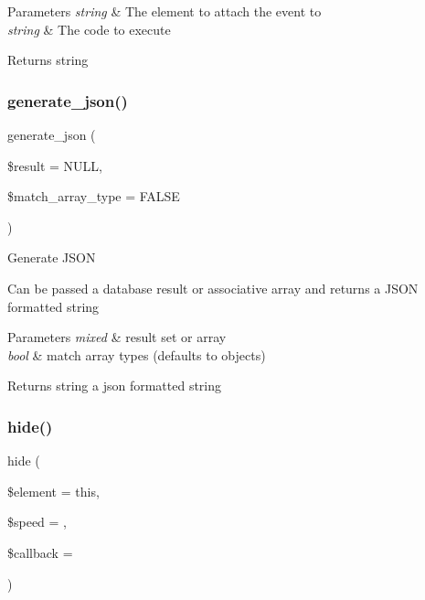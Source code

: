 \begin{DoxyParams}{Parameters}
{\em string} & The element to attach the event to \\
\hline
{\em string} & The code to execute \\
\hline
\end{DoxyParams}
\begin{DoxyReturn}{Returns}
string 
\end{DoxyReturn}
\mbox{\label{class_c_i___javascript_ae60bb50a1e4cbbce1f6c29a73fad5e07}} 
\subsubsection{\texorpdfstring{generate\+\_\+json()}{generate\_json()}}
{\footnotesize\ttfamily generate\+\_\+json (\begin{DoxyParamCaption}\item[{}]{\$result = {\ttfamily NULL},  }\item[{}]{\$match\+\_\+array\+\_\+type = {\ttfamily FALSE} }\end{DoxyParamCaption})}

Generate J\+S\+ON

Can be passed a database result or associative array and returns a J\+S\+ON formatted string


\begin{DoxyParams}{Parameters}
{\em mixed} & result set or array \\
\hline
{\em bool} & match array types (defaults to objects) \\
\hline
\end{DoxyParams}
\begin{DoxyReturn}{Returns}
string a json formatted string 
\end{DoxyReturn}
\mbox{\label{class_c_i___javascript_ace07091981f312c3be8238f08815142c}} 
\subsubsection{\texorpdfstring{hide()}{hide()}}
{\footnotesize\ttfamily hide (\begin{DoxyParamCaption}\item[{}]{\$element = {\ttfamily \textquotesingle{}this\textquotesingle{}},  }\item[{}]{\$speed = {\ttfamily \textquotesingle{}\textquotesingle{}},  }\item[{}]{\$callback = {\ttfamily \textquotesingle{}\textquotesingle{}} }\end{DoxyParamCaption})}

